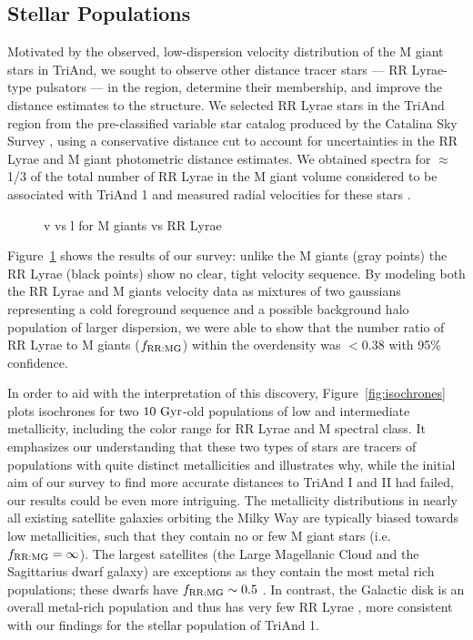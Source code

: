 \documentclass[galaxies,article,submit,moreauthors,pdftex,10pt,a4paper]{mdpi}
\newcommand{\frrmg}{\ensuremath{f_{\rm RR:MG}}}
\begin{document}
\subsection{Stellar Populations}

Motivated by the observed, low-dispersion velocity distribution of the M giant stars in TriAnd, we sought to observe other distance tracer stars --- RR Lyrae-type pulsators --- in the region, determine their membership, and improve the distance estimates to the structure.
We selected RR Lyrae stars in the TriAnd region from the pre-classified
variable star catalog produced by the Catalina Sky Survey \citep{drake14},
using a conservative distance cut to account for uncertainties in the RR Lyrae
and M giant photometric distance estimates.
We obtained spectra for $\approx$1/3 of the total number of RR Lyrae in the M
giant volume considered to be associated with TriAnd 1 and measured radial
velocities for these stars \cite{pricewhelan15}.

\begin{figure}[t]
\centering
\caption{\label{fig:apw}
v vs l for M giants vs RR Lyrae}
\end{figure}

Figure~\ref{fig:apw} \citep[reproduced from][]{pricewhelan15} shows the results of our survey: unlike the M giants (gray points) the RR Lyrae (black points) show no clear, tight velocity sequence.
By modeling both the RR Lyrae and M giants velocity data as mixtures of two gaussians representing a cold foreground sequence and a possible background halo population of larger dispersion, we were able to show that the number ratio of RR Lyrae to M giants (\frrmg) within the overdensity was $<0.38$ with 95\% confidence.

In order to aid with the interpretation of this discovery, Figure~\ref{fig:isochrones} plots isochrones for two $10~{\rm Gyr}$-old populations of low and intermediate metallicity, including the color range for RR Lyrae and M spectral class.
It emphasizes our understanding that these two types of stars are tracers of populations with quite distinct metallicities and illustrates why, while the initial aim of our survey to find more accurate distances to TriAnd I and II had failed, our results could be even more intriguing.
The metallicity distributions in nearly all existing satellite galaxies
orbiting the Milky Way \citep[e.g.,][]{kirby11} are typically biased towards
low metallicities, such that they contain no or few M giant stars (i.e. $\frrmg = \infty$).
The largest satellites (the Large Magellanic Cloud and the Sagittarius dwarf galaxy) are exceptions as they contain the most metal rich populations; these dwarfs have $\frrmg \sim 0.5$ \citep{pricewhelan15}.
In contrast, the Galactic disk is an overall metal-rich population and thus has very few RR Lyrae \citep[i.e. $f_{\rm RR:M} \sim 0$][]{amrose01}, more consistent with our findings for the stellar population of TriAnd 1.
\end{document}
